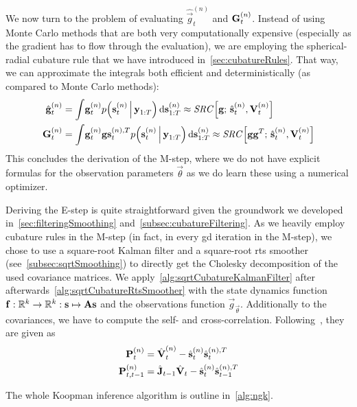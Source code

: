 	We now turn to the problem of evaluating \( \hat{\vec{g}}_t^{(n)} \) and \( \boldsymbol{\mathrm{G}}_t^{(n)} \). Instead of using Monte Carlo methods that are both very computationally expensive (especially as the gradient has to flow through the evaluation), we are employing the spherical-radial cubature rule that we have introduced in~\autoref{sec:cubatureRules}. That way, we can approximate the integrals both efficient and deterministically (as compared to Monte Carlo methods):
	\begin{align}
		\hat{\boldsymbol{\mathrm{g}}}_t^{(n)} &= \int\! \boldsymbol{\mathrm{g}}_t^{(n)} p\Big(\boldsymbol{\mathrm{s}}_t^{(n)} \,\Big\vert\, \boldsymbol{\mathrm{y}}_{1:T}\Big) \dd{\boldsymbol{\mathrm{s}}_{1:T}^{(n)}} \approx \mathit{SRC}\Big[\boldsymbol{\mathrm{g}};\, \hat{\boldsymbol{\mathrm{s}}}_t^{(n)}, \boldsymbol{\mathrm{V}}_t^{(n)}\Big]  \label{eq:ngkgeval} \\
		\boldsymbol{\mathrm{G}}_t^{(n)}       &= \int\! \boldsymbol{\mathrm{g}}_t^{(n)} \boldsymbol{\mathrm{g}}\boldsymbol{\mathrm{s}}_t^{(n), T} p\Big(\boldsymbol{\mathrm{s}}_t^{(n)} \,\Big\vert\, \boldsymbol{\mathrm{y}}_{1:T} \Big) \dd{\boldsymbol{\mathrm{s}}_{1:T}^{(n)}} \approx \mathit{SRC}\Big[\boldsymbol{\mathrm{g}} \boldsymbol{\mathrm{g}}^T;\, \hat{\boldsymbol{\mathrm{s}}}_t^{(n)}, \boldsymbol{\mathrm{V}}_t^{(n)}\Big]  \label{eq:ngkGeval}
	\end{align}
	This concludes the derivation of the M-step, where we do not have explicit formulas for the observation parameters \(\vec{\theta}\) as we do learn these using a numerical optimizer.

	Deriving the E-step is quite straightforward given the groundwork we developed in~\autoref{sec:filteringSmoothing} and~\autoref{subsec:cubatureFiltering}. As we heavily employ cubature rules in the M-step (in fact, in every \ac{gd} iteration in the M-step), we chose to use a square-root Kalman filter and a square-root \ac{rts} smoother (see~\autoref{subsec:sqrtSmoothing}) to directly get the Cholesky decomposition of the used covariance matrices. We apply~\autoref{alg:sqrtCubatureKalmanFilter} after afterwards~\autoref{alg:sqrtCubatureRtsSmoother} with the state dynamics function \( \boldsymbol{\mathrm{f}} : \mathbb{R}^k \to \mathbb{R}^k : \boldsymbol{\mathrm{s}} \mapsto \boldsymbol{\mathrm{A}} \boldsymbol{\mathrm{s}} \) and the observations function \( \vec{g}_{\vec{\theta}} \). Additionally to the covariances, we have to compute the self- and cross-correlation. Following~\cite{minkaHiddenMarkovModels1999}, they are given as
	\begin{align*}
		\boldsymbol{\mathrm{P}}_t^{(n)} &= \hat{\boldsymbol{\mathrm{V}}}_t^{(n)} - \hat{\boldsymbol{\mathrm{s}}}_t^{(n)} \hat{\boldsymbol{\mathrm{s}}}_t^{(n), T} \\
		\boldsymbol{\mathrm{P}}_{t, t - 1}^{(n)} &= \hat{\boldsymbol{\mathrm{J}}}_{t - 1} \hat{\boldsymbol{\mathrm{V}}}_t - \hat{\boldsymbol{\mathrm{s}}}_{t}^{(n)} \hat{\boldsymbol{\mathrm{s}}}_{t - 1}^{(n), T}
	\end{align*}

	The whole Koopman inference algorithm is outline in~\autoref{alg:ngk}.

